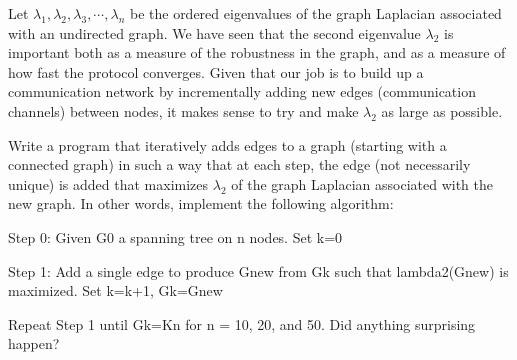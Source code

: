 \documentclass{article}
\begin{document}
\begin{problem}
Let $\lambda_1, \lambda_2, \lambda_3, \cdots, \lambda_n $ be the ordered eigenvalues of the graph Laplacian associated with an undirected graph. We have seen that the second eigenvalue $\lambda_2$ is important both as a measure of the robustness in the graph, and as a measure of how fast the protocol converges. Given that our job is to build up a communication network by incrementally adding new edges (communication channels) between nodes, it makes sense to try and make $\lambda_2$ as large as possible.
    
Write a program that iteratively adds edges to a graph (starting with a connected graph) in such a way that at each step, the edge (not necessarily unique) is added that maximizes $\lambda_2$ of the graph Laplacian associated with the new graph. In other words, implement the following algorithm: 

Step 0: Given G0 a spanning tree on n nodes. Set k=0

Step 1: Add a single edge to produce Gnew from Gk such that lambda2(Gnew) is maximized. Set k=k+1, Gk=Gnew

Repeat Step 1 until Gk=Kn for n = 10, 20, and 50. Did anything surprising happen?
\end{problem}
\end{document}
